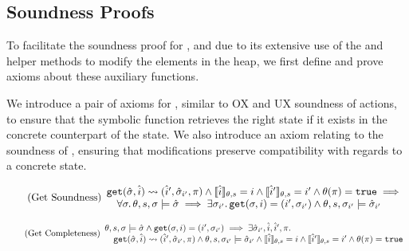 \subsection{Soundness Proofs}

To facilitate the soundness proof for \PMap, and due to its extensive use of the  and  helper methods to modify the elements in the heap, we first define and prove axioms about these auxiliary functions.

We introduce a pair of axioms for , similar to OX and UX soundness of actions, to ensure that the symbolic function retrieves the right state if it exists in the concrete counterpart of the state. We also introduce an axiom relating to the soundness of , ensuring that modifications preserve compatibility with regards to a concrete state.


\begin{equation}
\tag{Get Soundness}\label{eq:get-sound}
\begin{array}{l}
\texttt{get}(\hat{\sigma},\hat{i})\rightsquigarrow(\hat{i}', \hat{\sigma}_{i'}, \pi) \land \llbracket\hat{i}\rrbracket_{\theta,s}=i \land \llbracket\hat{i}'\rrbracket_{\theta,s}=i' \land \theta(\pi)=\texttt{true} \implies \\
\quad \forall \sigma\ldotp \theta,s,\sigma \models \hat{\sigma} \implies \exists \sigma_{i'} \ldotp \texttt{get}(\sigma, i)=(i', \sigma_{i'}) \land \theta,s,\sigma_{i'} \models \hat{\sigma}_{i'}
\end{array}
\end{equation}

\begin{equation}
\tag{Get Completeness}\label{eq:get-complete}
\begin{array}{l}
\theta,s,\sigma \models \hat{\sigma} \land \texttt{get}(\sigma, i)=(i', \sigma_{i'}) \implies \exists \hat{\sigma}_{i'}, \hat{i}, \hat{i}', \pi \ldotp \\
\quad \texttt{get}(\hat{\sigma},\hat{i})\rightsquigarrow(\hat{i}', \hat{\sigma}_{i'}, \pi) \land \theta,s,\sigma_{i'}\models\hat{\sigma}_{i'} \land \llbracket\hat{i}\rrbracket_{\theta,s}=i \land \llbracket\hat{i}'\rrbracket_{\theta,s}=i' \land \theta(\pi)=\texttt{true}
\end{array}
\end{equation}


